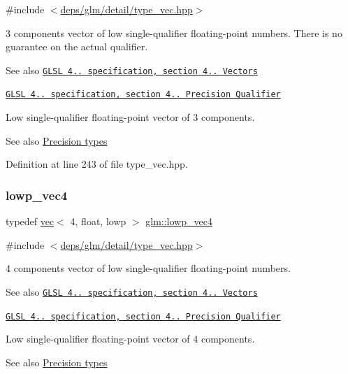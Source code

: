 {\ttfamily \#include $<$\hyperlink{type__vec_8hpp}{deps/glm/detail/type\+\_\+vec.\+hpp}$>$}

3 components vector of low single-\/qualifier floating-\/point numbers. There is no guarantee on the actual qualifier.

\begin{DoxySeeAlso}{See also}
\href{http://www.opengl.org/registry/doc/GLSLangSpec.4.20.8.pdf}{\tt G\+L\+SL 4.. specification, section 4.. Vectors} 

\href{http://www.opengl.org/registry/doc/GLSLangSpec.4.20.8.pdf}{\tt G\+L\+SL 4.. specification, section 4.. Precision Qualifier}
\end{DoxySeeAlso}
Low single-\/qualifier floating-\/point vector of 3 components. \begin{DoxySeeAlso}{See also}
\hyperlink{group__core__precision}{Precision types} 
\end{DoxySeeAlso}


Definition at line 243 of file type\+\_\+vec.\+hpp.

\mbox{\label{group__core__precision_ga9235d8ac062ef68826948ac1df016036}} 
\subsubsection{\texorpdfstring{lowp\+\_\+vec4}{lowp\_vec4}}
{\footnotesize\ttfamily typedef \hyperlink{structglm_1_1vec}{vec}$<$ 4, float, lowp $>$ \hyperlink{group__core__precision_ga9235d8ac062ef68826948ac1df016036}{glm\+::lowp\+\_\+vec4}}



{\ttfamily \#include $<$\hyperlink{type__vec_8hpp}{deps/glm/detail/type\+\_\+vec.\+hpp}$>$}

4 components vector of low single-\/qualifier floating-\/point numbers.

\begin{DoxySeeAlso}{See also}
\href{http://www.opengl.org/registry/doc/GLSLangSpec.4.20.8.pdf}{\tt G\+L\+SL 4.. specification, section 4.. Vectors} 

\href{http://www.opengl.org/registry/doc/GLSLangSpec.4.20.8.pdf}{\tt G\+L\+SL 4.. specification, section 4.. Precision Qualifier}
\end{DoxySeeAlso}
Low single-\/qualifier floating-\/point vector of 4 components. \begin{DoxySeeAlso}{See also}
\hyperlink{group__core__precision}{Precision types} 
\end{DoxySeeAlso}


